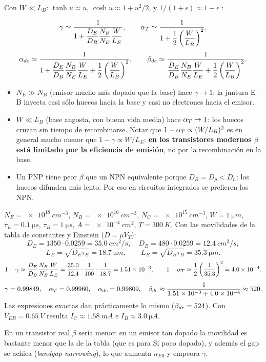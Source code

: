 Con $W\ll L_B$: $\tanh u\approx u$, $\cosh u\approx1+u^2/2$, y $1/(1+\epsilon)\approx1-\epsilon$
:

\begin{clave}
\[
  \gamma \simeq \frac{1}{1+\dfrac{D_E}{D_B}\dfrac{N_B}{N_E}\dfrac{W}{L_E}},
  \qquad
  \alpha_T \simeq \frac{1}{1+\dfrac{1}{2}\left(\dfrac{W}{L_B}\right)^2},
\]
\[
  \alpha_{dc} \simeq \frac{1}{1+\dfrac{D_E}{D_B}\dfrac{N_B}{N_E}\dfrac{W}{L_E}
          +\dfrac{1}{2}\left(\dfrac{W}{L_B}\right)^2},
  \qquad
  \beta_{dc} \simeq \frac{1}{\dfrac{D_E}{D_B}\dfrac{N_B}{N_E}\dfrac{W}{L_E}
          +\dfrac{1}{2}\left(\dfrac{W}{L_B}\right)^2}.
\]
\end{clave}

\begin{intuicion}
\begin{itemize}
  \item \textbf{$N_E\gg N_B$} (emisor mucho más dopado que la base) hace $\gamma\to1$: la
  juntura E--B inyecta casi sólo huecos hacia la base y casi no electrones hacia el emisor.
  \item \textbf{$W\ll L_B$} (base angosta, con buena vida media) hace $\alpha_T\to1$: los huecos
  cruzan sin tiempo de recombinarse. Notar que $1-\alpha_T\propto(W/L_B)^2$ es en general
  mucho menor que $1-\gamma\propto W/L_E$: \textbf{en los transistores modernos $\beta$ está
  limitado por la eficiencia de emisión}, no por la recombinación en la base.
  \item Un PNP tiene peor $\beta$ que un NPN equivalente porque $D_B=D_p<D_n$: los huecos
  difunden más lento. Por eso en circuitos integrados se prefieren los NPN.
\end{itemize}
\end{intuicion}

\begin{ejemplo}
$N_E=\SI{e18}{cm^{-3}}$, $N_B=\SI{e16}{cm^{-3}}$, $N_C=\SI{e15}{cm^{-3}}$, $W=\SI{1}{\micro m}$,
$\tau_E=\SI{0.1}{\micro s}$, $\tau_B=\SI{1}{\micro s}$, $A=\SI{e-4}{cm^2}$, $T=\SI{300}{K}$.
Con las movilidades de la tabla de constantes y Einstein ($D=\mu V_T$):
\[
  D_E = 1350\cdot0.0259 = \SI{35.0}{cm^2/s},\quad
  D_B = 480\cdot0.0259 = \SI{12.4}{cm^2/s},
\]
\[
  L_E=\sqrt{D_E\tau_E}=\SI{18.7}{\micro m},\qquad L_B=\sqrt{D_B\tau_B}=\SI{35.3}{\micro m}.
\]
\[
  1-\gamma\approx\frac{D_E}{D_B}\frac{N_B}{N_E}\frac{W}{L_E}
  =\frac{35.0}{12.4}\cdot\frac{1}{100}\cdot\frac{1}{18.7}=\num{1.51e-3},
  \qquad
  1-\alpha_T\approx\frac12\left(\frac{1}{35.3}\right)^2=\num{4.0e-4}.
\]
\[
  \gamma=0.99849,\quad \alpha_T=0.99960,\quad \alpha_{dc}=0.99809,\quad
  \beta_{dc}\approx\frac{1}{\num{1.51e-3}+\num{4.0e-4}}\approx 520 .
\]
Las expresiones exactas dan prácticamente lo mismo ($\beta_{dc}=524$). Con
$V_{EB}=\SI{0.65}{V}$ resulta $I_C\approx\SI{1.58}{mA}$ e $I_B\approx\SI{3.0}{\micro A}$.

En un transistor real $\beta$ sería menor: en un emisor tan dopado la movilidad es bastante
menor que la de la tabla (que es para Si poco dopado), y además el gap se achica
(\emph{bandgap narrowing}), lo que aumenta $n_{E0}$ y empeora $\gamma$.
\end{ejemplo}
